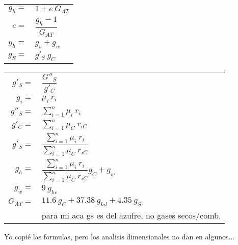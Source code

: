 \documentclass[11pt,a4paper]{article}
\begin{document}
\begin{cajita}
\begin{multicols}{2}
\begin{tabular}{r p{}}
			\end{tabular}
			\begin{tabular}{r l }
			$g_{h}=$&$1+e~G_{AT}$\\[0.2cm]
			$e=$&$\dfrac{g_{h}-1}{G_{AT}}$\\
			$g_{h}=$&$g_{s}+g_{w}$\\
			$g_{S}=$&$g'_{S}~g_{C}$\\
			\end{tabular}
			\begin{tabular}{r l }
				$g'_{S}=$&$\dfrac{G''_{S}}{g'_{C}}$\\
				$g_{i}=$&$\mu_{i}~r_{i}$\\[0.3cm]
				$g''_{S}=$&$\displaystyle \sum_{i=1}^{n} \mu_{i}~r_{i}$\\[0.3cm]
				$g'_{C}=$&$\displaystyle \sum_{i=1}^{n} \mu_{C}~r_{iC}$\\[0.3cm]
				$g'_{S}=$&$\dfrac{\sum_{i=1}^{n} \mu_{i}~r_{i}}{\sum_{i=1}^{n} \mu_{C}~r_{iC}}$\\[0.3cm]
				$g_{h}=$&$\dfrac{\sum_{i=1}^{n} \mu_{i}~r_{i}}{\sum_{i=1}^{n} \mu_{C}~r_{iC}} g_{C}+g_{w}$\\[0.35cm]
				$g_{w}=$&$9~g_{he}$\\[0.1cm]
				$G_{AT}=$&$11.6~g_{C}+37.38~g_{hd}+4.35~g_{S}$\\
				&\tiny{para mi aca gs es del azufre, no gases secos/comb.}
			\end{tabular}
		\end{multicols}
	Yo copié las formulas, pero los analisis dimensionales no dan en algunos...
	\end{cajita}
		
\end{document}
